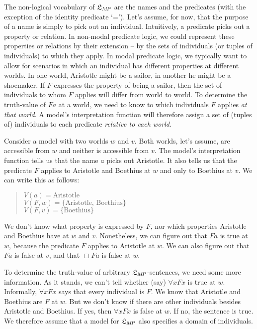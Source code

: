 The non-logical vocabulary of $\mathfrak{L}_{M\!P}$ are the names and the predicates (with
the exception of the identity predicate `='). Let's assume, for now, that the
purpose of a name is simply to pick out an individual. Intuitively, a predicate
picks out a property or relation. In non-modal predicate logic, we could
represent these properties or relations by their extension -- by the sets of
individuals (or tuples of individuals) to which they apply. In modal predicate
logic, we typically want to allow for scenarios in which an individual
has different properties at different worlds. In one world, Aristotle might be a
sailor, in another he might be a shoemaker. If $F$ expresses the property of
being a sailor, then the set of individuals to whom $F$ applies will differ from
world to world. To determine the truth-value of $Fa$ at a world, we need to know
to which individuals $F$ applies \emph{at that world}. A model's interpretation
function will therefore assign a set of (tuples of) individuals to each
predicate \emph{relative to each world}.

Consider a model with two worlds $w$ and $v$. Both worlds, let's assume, are
accessible from $w$ and neither is accessible from $v$. The model's
interpretation function tells us that the name $a$ picks out Aristotle. It
also tells us that the predicate $F$ applies to Aristotle and Boethius at $w$
and only to Boethius at $v$. We can write this as follows:
%
\begin{quote}
  $V(a) = \text{Aristotle}$\\
  $V(F,w) = \{ \text{Aristotle, Boethius} \}$\\
  $V(F,v) = \{ \text{Boethius} \}$
\end{quote}
%
\noindent%
We don't know what property is expressed by $F$, nor which properties Aristotle
and Boethius have at $w$ and $v$. Nonetheless, we can figure out that $Fa$ is
true at $w$, because the predicate $F$ applies to Aristotle at $w$. We can also
figure out that $Fa$ is false at $v$, and that $\Box Fa$ is false at $w$.

To determine the truth-value of arbitrary $\mathfrak{L}_{M\!P}$-sentences, we need some
more information. As it stands, we can't tell whether (say) $\forall x Fx$ is
true at $w$. Informally, $\forall x Fx$ says that every individual is $F$. We
know that Aristotle and Boethius are $F$ at $w$. But we don't know if there are
other individuals besides Aristotle and Boethius. If yes, then $\forall x Fx$ is
false at $w$. If no, the sentence is true. We therefore assume that a model for
$\mathfrak{L}_{M\!P}$ also specifies a domain of individuals.

